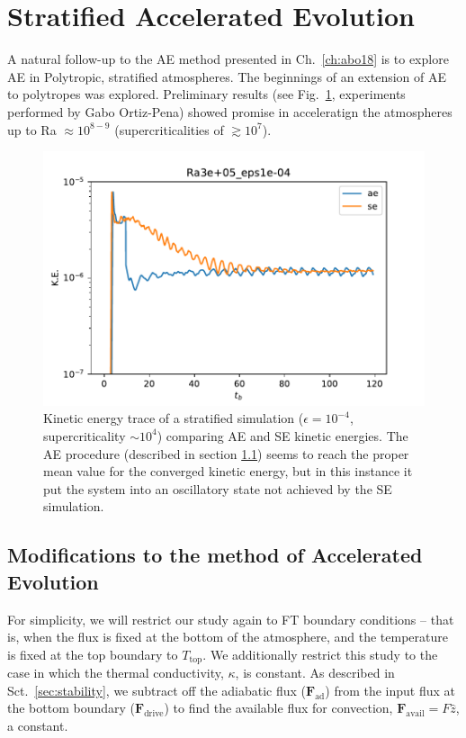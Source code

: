 \section{Stratified Accelerated Evolution}
\label{sec:stratified_ae}
A natural follow-up to the AE method presented in Ch.~\ref{ch:abo18} is to explore AE in Polytropic, stratified atmospheres.
The beginnings of an extension of AE to polytropes was explored.
Preliminary results (see Fig.~\ref{fig:gabo_ae}, experiments performed by Gabo Ortiz-Pena) showed promise in acceleratign the atmospheres up to Ra $\approx 10^{8-9}$ (supercriticalities of $\gtrsim 10^7$).


\begin{figure}[t!]
    \includegraphics[width=\textwidth]{figs/unpublished/gabo_ae.pdf}
    \caption[Stratified Accelerated Evolution Timeseries]{
	Kinetic energy trace of a stratified simulation ($\epsilon = 10^{-4}$, supercriticality $\sim 10^4$) comparing AE and SE kinetic energies.
	The AE procedure (described in section \ref{sec:ae}) seems to reach the proper mean value for the converged kinetic energy, but in this instance it put the system into an oscillatory state not achieved by the SE simulation.
    \label{fig:gabo_ae} }
\end{figure}




\subsection{Modifications to the method of Accelerated Evolution}
\label{sec:ae}
For simplicity, we will restrict our study again to FT boundary conditions -- that is, when the flux is fixed at the bottom of the atmosphere, and the temperature is fixed at the top boundary to $T_{\text{top}}$.
We additionally restrict this study to the case in which the thermal conductivity, $\kappa$, is constant.
As described in Sct.~\ref{sec:stability}, we subtract off the adiabatic flux ($\bm{F}_{\text{ad}}$) from the input flux at the bottom boundary ($\bm{F}_{\text{drive}}$) to find the available flux for convection, $\bm{F}_{\text{avail}} = F \hat{z}$, a constant.


